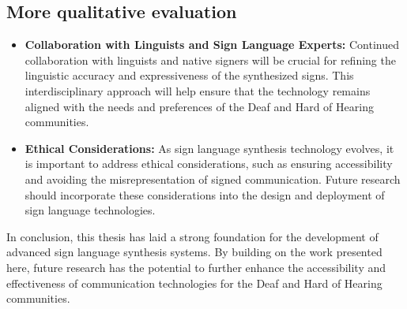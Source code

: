 \documentclass[../../main.tex]{subfiles}
\begin{document}
\subsection{More qualitative evaluation}

\begin{itemize}
    \item \textbf{Collaboration with Linguists and Sign Language Experts:} Continued collaboration with linguists and native signers will be crucial for refining the linguistic accuracy and expressiveness of the synthesized signs. This interdisciplinary approach will help ensure that the technology remains aligned with the needs and preferences of the Deaf and Hard of Hearing communities.
    
    \item \textbf{Ethical Considerations:} As sign language synthesis technology evolves, it is important to address ethical considerations, such as ensuring accessibility and avoiding the misrepresentation of signed communication. Future research should incorporate these considerations into the design and deployment of sign language technologies.
\end{itemize}


In conclusion, this thesis has laid a strong foundation for the development of advanced sign language synthesis systems. By building on the work presented here, future research has the potential to further enhance the accessibility and effectiveness of communication technologies for the Deaf and Hard of Hearing communities.
\end{document}
